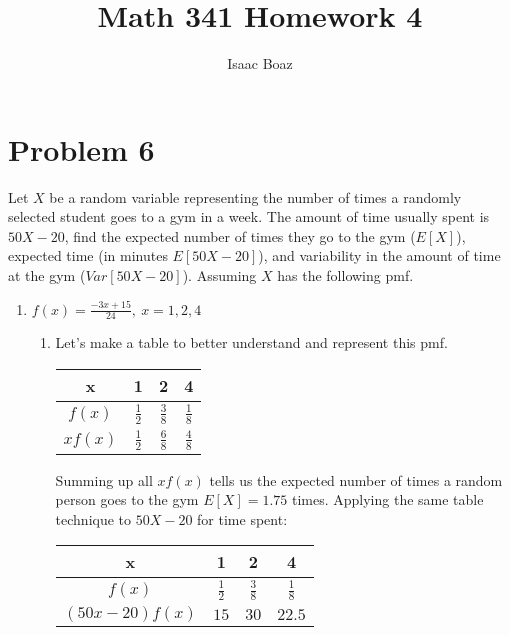 \documentclass{article}
\title{Math 341 Homework 4}
\author{Isaac Boaz}
\begin{document}
\maketitle

\section*{Problem 6}
Let \(X\) be a random variable representing the number of times a randomly selected student goes to a gym in a week.
The amount of time usually spent is \(50X - 20\), find the expected number of times they go to the gym (\(E[X]\)), expected time (in minutes \(E[50X - 20]\)), and variability in the amount of time at the gym (\(Var[50X - 20]\)). Assuming \(X\) has the following pmf.
\begin{enumerate}[label = \alph*)]
    \item \(f(x) = \frac{-3x+15}{24},\ x = 1,2,4\)
          \begin{enumerate}
              \item Let's make a table to better understand and represent this pmf.
                    \begin{center}
                        \begin{tabular}{c|ccc}
                            x         & 1               & 2               & 4               \\
                            \hline
                            \(f(x)\)  & \(\frac{1}{2}\) & \(\frac{3}{8}\) & \(\frac{1}{8}\) \\
                            \(xf(x)\) & \(\frac{1}{2}\) & \(\frac{6}{8}\) & \(\frac{4}{8}\)
                        \end{tabular}
                    \end{center}
                    Summing up all \(xf(x)\) tells us the expected number of times a random person goes to the gym \(E[X] = 1.75\) times.
                    Applying the same table technique to \(50X - 20\) for time spent:
                    \begin{center}
                        \begin{tabular}{c|ccc}
                            x                  & 1               & 2               & 4               \\
                            \hline
                            \(f(x)\)           & \(\frac{1}{2}\) & \(\frac{3}{8}\) & \(\frac{1}{8}\) \\
                            \((50x - 20)f(x)\) & \(15\)          & \(30\)          & \(22.5\)

\end{tabular}
\end{center}
\end{enumerate}
\end{enumerate}
\end{document}
